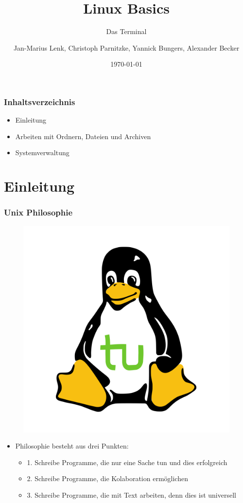 \documentclass[12pt,utf8]{beamer}
\title{Linux Basics}
\subtitle{Das Terminal}
\author[J.-M. Lenk, C. Parnitzke, Y. Bungers]{Jan-Marius Lenk, Christoph Parnitzke, Yannick Bungers, Alexander Becker}
\institute[FOSS AG]{Free and Open Source Software AG\\ Fakultät für Informatik}
\date{\today}
\begin{document}
\titlepage

\begin{frame}
\frametitle{Inhaltsverzeichnis}
\begin{itemize}
	\item Einleitung
	\item Arbeiten mit Ordnern, Dateien und Archiven
	\item Systemverwaltung
\end{itemize}
\end{frame}

\section{Einleitung}
\begin{frame}
\frametitle{Unix Philosophie}
\begin{figure}
\includegraphics[scale=0.15]{res/tuX_tu.png}
\end{figure}
\begin{itemize}
	\item Philosophie besteht aus drei Punkten:
	\begin{itemize}
		\item 1. Schreibe Programme, die nur eine Sache tun und dies erfolgreich
		\item 2. Schreibe Programme, die Kolaboration ermöglichen
		\item 3. Schreibe Programme, die mit Text arbeiten, denn dies ist universell
	\end{itemize}
\end{itemize}
\end{frame}
\end{document}
